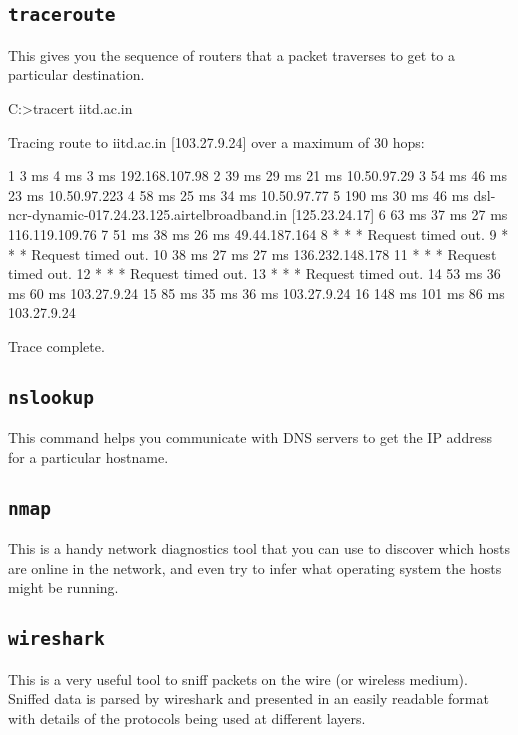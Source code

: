 \subsection{\tt traceroute}
This gives you the sequence of routers that a packet traverses to get to a particular destination.
\begin{code}
C:\Users\Anish>tracert iitd.ac.in

Tracing route to iitd.ac.in [103.27.9.24]
over a maximum of 30 hops:

1     3 ms     4 ms     3 ms  192.168.107.98
2    39 ms    29 ms    21 ms  10.50.97.29
3    54 ms    46 ms    23 ms  10.50.97.223
4    58 ms    25 ms    34 ms  10.50.97.77
5   190 ms    30 ms    46 ms  dsl-ncr-dynamic-017.24.23.125.airtelbroadband.in [125.23.24.17]
6    63 ms    37 ms    27 ms  116.119.109.76
7    51 ms    38 ms    26 ms  49.44.187.164
8     *        *        *     Request timed out.
9     *        *        *     Request timed out.
10    38 ms    27 ms    27 ms  136.232.148.178
11     *        *        *     Request timed out.
12     *        *        *     Request timed out.
13     *        *        *     Request timed out.
14    53 ms    36 ms    60 ms  103.27.9.24
15    85 ms    35 ms    36 ms  103.27.9.24
16   148 ms   101 ms    86 ms  103.27.9.24

Trace complete.
\end{code}
\subsection{\tt nslookup}
This command helps you communicate with DNS servers to get the IP address for a particular hostname.

\subsection{\tt nmap}
This is a handy network diagnostics tool that you can use to discover which hosts are online in the network, and even try to infer what operating system the hosts might be running.

\subsection{\tt wireshark}
This is a very useful tool to sniff packets on the wire (or wireless medium). Sniffed data is parsed by wireshark and presented in an easily readable format with details of the protocols being used at different layers.
